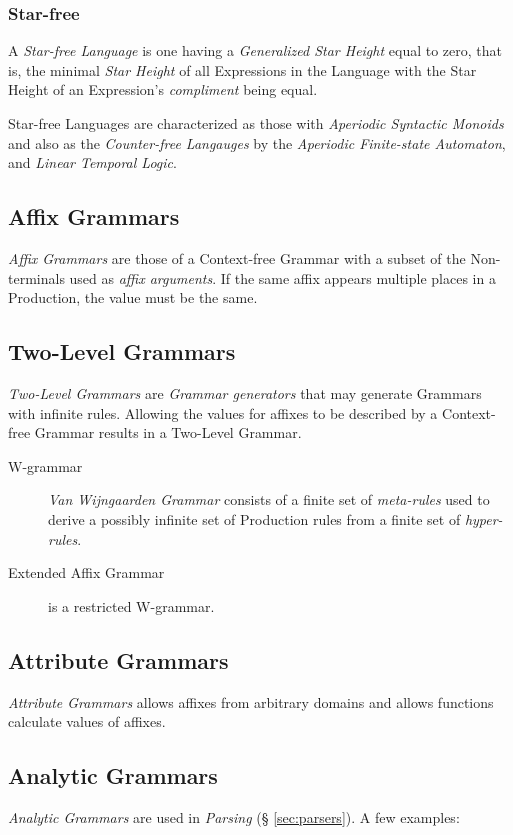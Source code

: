 \documentclass{article}
\begin{document}
\subsubsection{Star-free}
A \emph{Star-free Language} is one having a \emph{Generalized Star
  Height} equal to zero, that is, the minimal \emph{Star Height} of
all Expressions in the Language with the Star Height of an
Expression's \emph{compliment} being equal.

Star-free Languages are characterized as those with \emph{Aperiodic
  Syntactic Monoids}\cite{schutzenberger65} and also as the
\emph{Counter-free Langauges}\cite{mcnaughton-papert71} by the
\emph{Aperiodic Finite-state Automaton}, and \emph{Linear Temporal
  Logic}. %

\subsection{Affix Grammars}
\emph{Affix Grammars} are those of a Context-free Grammar with a
subset of the Non-terminals used as \emph{affix arguments}. If the
same affix appears multiple places in a Production, the value must be
the same.

\subsection{Two-Level Grammars}
\emph{Two-Level Grammars} are \emph{Grammar generators} that may
generate Grammars with infinite rules. Allowing the values for affixes
to be described by a Context-free Grammar results in a Two-Level
Grammar.


\begin{description}
\item[W-grammar] \emph{Van Wijngaarden Grammar} consists of a finite
  set of \emph{meta-rules} used to derive a possibly infinite set of
  Production rules from a finite set of \emph{hyper-rules}.
\item[Extended Affix Grammar] is a restricted W-grammar.
\end{description}

\subsection{Attribute Grammars}
\emph{Attribute Grammars} allows affixes from arbitrary domains and
allows functions calculate values of affixes.

\subsection{Analytic Grammars}
\emph{Analytic Grammars} are used in \emph{Parsing} (\S
\ref{sec:parsers}). A few examples:
\end{document}
